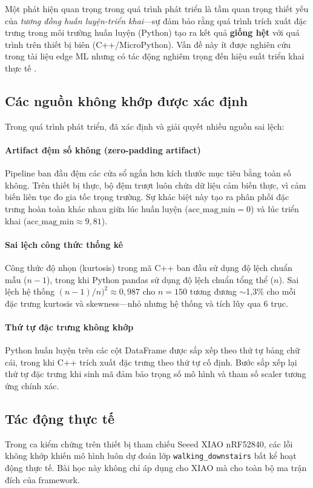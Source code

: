 Một phát hiện quan trọng trong quá trình phát triển là tầm quan trọng thiết yếu của \textit{tương đồng huấn luyện-triển khai}---sự đảm bảo rằng quá trình trích xuất đặc trưng trong môi trường huấn luyện (Python) tạo ra kết quả \textbf{giống hệt} với quá trình trên thiết bị biên (C++/MicroPython). Vấn đề này ít được nghiên cứu trong tài liệu edge ML nhưng có tác động nghiêm trọng đến hiệu suất triển khai thực tế \cite{paleyes2022challenges, sculley2015hidden}.

\subsection{Các nguồn không khớp được xác định}
Trong quá trình phát triển, đã xác định và giải quyết nhiều nguồn sai lệch:

\paragraph{Artifact đệm số không (zero-padding artifact)}
Pipeline ban đầu đệm các cửa sổ ngắn hơn kích thước mục tiêu bằng toàn số không. Trên thiết bị thực, bộ đệm trượt luôn chứa dữ liệu cảm biến thực, vì cảm biến liên tục đo gia tốc trọng trường. Sự khác biệt này tạo ra phân phối đặc trưng hoàn toàn khác nhau giữa lúc huấn luyện ($\text{acc\_mag\_min} = 0$) và lúc triển khai ($\text{acc\_mag\_min} \approx 9{,}81$).

\paragraph{Sai lệch công thức thống kê}
Công thức độ nhọn (kurtosis) trong mã C++ ban đầu sử dụng độ lệch chuẩn mẫu ($n-1$), trong khi Python pandas sử dụng độ lệch chuẩn tổng thể ($n$). Sai lệch hệ thống $(n-1)/n)^2 \approx 0{,}987$ cho $n = 150$ tương đương $\sim$1,3\% cho mỗi đặc trưng kurtosis và skewness---nhỏ nhưng hệ thống và tích lũy qua 6 trục.

\paragraph{Thứ tự đặc trưng không khớp}
Python huấn luyện trên các cột DataFrame được sắp xếp theo thứ tự bảng chữ cái, trong khi C++ trích xuất đặc trưng theo thứ tự cố định. Bước sắp xếp lại thứ tự đặc trưng khi sinh mã đảm bảo trọng số mô hình và tham số scaler tương ứng chính xác.

\subsection{Tác động thực tế}
Trong ca kiểm chứng trên thiết bị tham chiếu Seeed XIAO nRF52840, các lỗi không khớp khiến mô hình luôn dự đoán lớp \texttt{walking\_downstairs} bất kể hoạt động thực tế. Bài học này không chỉ áp dụng cho XIAO mà cho toàn bộ ma trận đích của framework.

